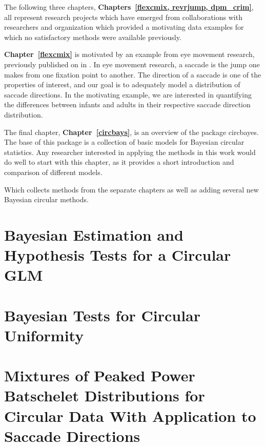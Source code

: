 \documentclass[12pt, a4paper]{book}\usepackage[]{graphicx}\usepackage[]{color}
\newcommand{\pkg}[1]{\textsf{#1}}
\begin{document}
The following three chapters, \textbf{Chapters~\ref{flexcmix, revrjump, dpm_crim}}, all represent research projects which have emerged from collaborations with researchers and organization which provided a motivating data examples for which no satisfactory methods were available previously.

\textbf{Chapter~\ref{flexcmix}} is motivated by an example from eye movement research, previously published on in \citet{van2016infants}. In eye movement research, a saccade is the jump one makes from one fixation point to another. The direction of a saccade is one of the properties of interest, and our goal is to adequately model a distribution of saccade directions. In the motivating example, we are interested in quantifying the differences between infants and adults in their respective saccade direction distribution.

The final chapter, \textbf{Chapter~\ref{circbays}}, is an overview of the package \pkg{circbayes}. The base of this package is a collection of basic models for Bayesian circular statistics. Any researcher interested in applying the methods in this work would do well to start with this chapter, as it provides a short introduction and comparison of different models.

Which collects methods from the separate chapters as well as adding several new Bayesian circular methods.




\chapter{Bayesian Estimation and Hypothesis Tests for a Circular GLM}
\label{circglm}



\chapter{Bayesian Tests for Circular Uniformity}
\label{hypotest}



\chapter{Mixtures of Peaked Power Batschelet Distributions for Circular Data  With Application to Saccade Directions}
\label{flexcmix}

%
%
\end{document}
